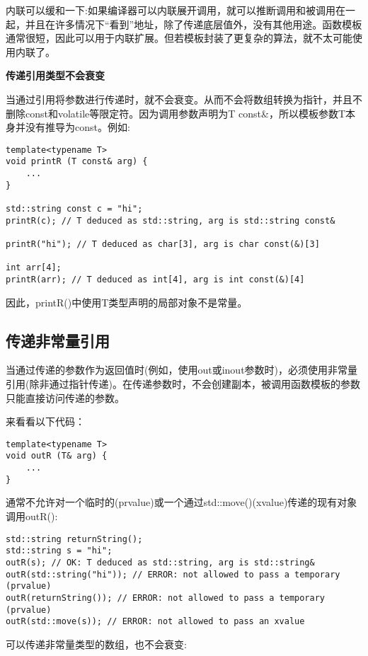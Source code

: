 内联可以缓和一下:如果编译器可以内联展开调用，就可以推断调用和被调用在一起，并且在许多情况下“看到”地址，除了传递底层值外，没有其他用途。函数模板通常很短，因此可以用于内联扩展。但若模板封装了更复杂的算法，就不太可能使用内联了。

\noindent
\textbf{传递引用类型不会衰变}

当通过引用将参数进行传递时，就不会衰变。从而不会将数组转换为指针，并且不删除const和volatile等限定符。因为调用参数声明为T const\&，所以模板参数T本身并没有推导为const。例如:

\begin{lstlisting}[style=styleCXX]
template<typename T>
void printR (T const& arg) {
	...
}

std::string const c = "hi";
printR(c); // T deduced as std::string, arg is std::string const&

printR("hi"); // T deduced as char[3], arg is char const(&)[3]

int arr[4];
printR(arr); // T deduced as int[4], arg is int const(&)[4]
\end{lstlisting}

因此，printR()中使用T类型声明的局部对象不是常量。

\subsection{传递非常量引用}

当通过传递的参数作为返回值时(例如，使用out或inout参数时)，必须使用非常量引用(除非通过指针传递)。在传递参数时，不会创建副本，被调用函数模板的参数只能直接访问传递的参数。

来看看以下代码：

\begin{lstlisting}[style=styleCXX]
template<typename T>
void outR (T& arg) {
	...
}
\end{lstlisting}

通常不允许对一个临时的(prvalue)或一个通过std::move()(xvalue)传递的现有对象调用outR():

\begin{lstlisting}[style=styleCXX]
std::string returnString();
std::string s = "hi";
outR(s); // OK: T deduced as std::string, arg is std::string&
outR(std::string("hi")); // ERROR: not allowed to pass a temporary (prvalue)
outR(returnString()); // ERROR: not allowed to pass a temporary (prvalue)
outR(std::move(s)); // ERROR: not allowed to pass an xvalue
\end{lstlisting}

可以传递非常量类型的数组，也不会衰变:

